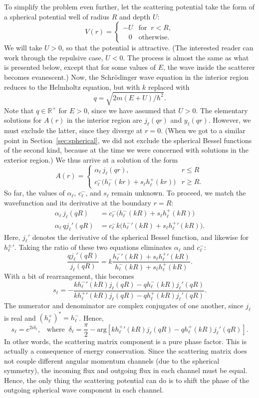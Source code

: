 \documentclass[pra,12pt]{revtex4}
\begin{document}
To simplify the problem even further, let the scattering potential
take the form of a spherical potential well of radius $R$ and depth
$U$:
$$V(r) = \begin{cases}-U &\mathrm{for}\;\; r < R, \\ \;\;\; 0 & \mathrm{otherwise}.\end{cases}$$
We will take $U > 0$, so that the potential is attractive.  (The
interested reader can work through the repulsive case, $U < 0$.  The
process is almost the same as what is presented below, except that for
some values of $E$, the wave inside the scatterer becomes evanescent.)
Now, the Schr\"odinger wave equation in the interior region reduces to
the Helmholtz equation, but with $k$ replaced with
$$q = \sqrt{2m(E+U)/\hbar^2}.$$
Note that $q \in \mathbb{R}^+$ for $E > 0$, since we have assumed
that $U > 0$.  The elementary solutions for $A(r)$ in the interior
region are $j_\ell(qr)$ and $y_\ell(qr)$.  However, we must exclude
the latter, since they diverge at $r = 0$.  (When we got to a similar
point in Section~\ref{sec:spherical}, we did not exclude the spherical
Bessel functions of the second kind, because at the time we were
concerned with solutions in the exterior region.)  We thus arrive at a
solution of the form
$$A(r) = \begin{cases} \alpha_\ell\, j_\ell(qr), & r \le R \\ c^-_\ell \Big(h^-_\ell(kr) + s_\ell h^+_\ell(kr)\Big) & r \ge R.\end{cases}$$
So far, the values of $\alpha_\ell$, $c^-_\ell$, and $s_\ell$ remain
unknown.  To proceed, we match the wavefunction and its
derivative at the boundary $r = R$:
$$\begin{aligned} \alpha_\ell\, j_\ell(qR) &= c^-_\ell \Big(h^-_\ell(kR) + s_\ell h^+_\ell(kR)\Big) \\ \alpha_\ell\, q j_\ell'(qR) &= c^-_\ell k \Big({h^-_\ell}'(kR) + s_\ell {h^+_\ell}'(kR)\Big).\end{aligned}$$
Here, $j_\ell'$ denotes the derivative of the spherical Bessel
function, and likewise for ${h_\ell^\pm}'$.  Taking the ratio of these
two equations eliminates $\alpha_\ell$ and $c_\ell^-$:
$$\frac{q j_\ell'(qR)}{j_\ell(qR)} = k \frac{{h^-_\ell}'(kR) + s_\ell {h^+_\ell}'(kR)}{h^-_\ell(kR) + s_\ell h^+_\ell(kR)}.$$
With a bit of rearrangement, this becomes
$$s_\ell = - \frac{k{h_\ell^-}'(kR) j_\ell(qR) - qh_\ell^-(kR)j_\ell'(qR)}{k{h_\ell^+}'(kR) j_\ell(qR) - qh_\ell^+(kR)j_\ell'(qR)}.$$
The numerator and denominator are complex conjugates of one another,
since $j_\ell$ is real and $(h_\ell^+)^* = h_\ell^-$.  Hence,
$$s_\ell = e^{2i\delta_\ell}, \;\;\;\mathrm{where}\;\; \delta_\ell = \frac{\pi}{2} - \mathrm{arg}\!\left[k{h_\ell^+}'(kR) j_\ell(qR) - qh_\ell^+(kR)j_\ell'(qR)\right].$$
In other words, the scattering matrix component is a pure phase
factor.  This is actually a consequence of energy conservation.  Since
the scattering matrix does not couple different angular momentum
channels (due to the spherical symmetry), the incoming flux and
outgoing flux in each channel must be equal.  Hence, the only thing
the scattering potential can do is to shift the phase of the outgoing
spherical wave component in each channel.
\end{document}

